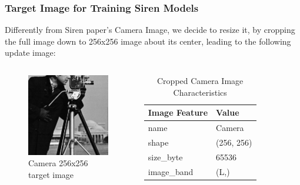 \begin{frame}
    \frametitle{Target Image for Training Siren Models}
        Differently from Siren paper's Camera Image, we decide to resize it, by cropping the full image down to 256x256 image about its center,
        leading to the following update image:
        \begin{columns}
            \begin{figure}
            \includegraphics[scale=0.2]{slides/experiments/target-image/images/cropped_cameramen_256x256.png}
            \caption{Camera 256x256 target image}
            \end{figure}

            \begin{table}
                \begin{tabular}{ll}
                \hline
                        Image Feature & Value \\
                \hline
                    name &      Camera \\
                    shape &  (256, 256) \\
                size\_byte &       65536 \\
                image\_band &        (L,) \\
                \hline
                \end{tabular}
                \caption{Cropped Camera Image Characteristics }
            \end{table}
        \end{columns}
\end{frame}

